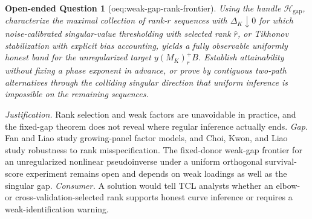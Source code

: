 \documentclass{article}
\newtheorem{openendedquestion}{Open-ended Question}
\begin{document}
\begin{openendedquestion}[oeq:weak-gap-rank-frontier]\label{oeq:weak-gap-rank-frontier}
Using the handle \(\mathcal H_{\mathrm{gap}}\), characterize the maximal collection of rank-\(r\) sequences with \(\Delta_K\downarrow0\) for which noise-calibrated singular-value thresholding with selected rank \(\widehat r\), or Tikhonov stabilization with explicit bias accounting, yields a fully observable uniformly honest band for the unregularized target \(y(M_K)_r^+B\). Establish attainability without fixing a phase exponent in advance, or prove by contiguous two-path alternatives through the colliding singular direction that uniform inference is impossible on the remaining sequences.
\end{openendedquestion}
\par\smallskip\noindent \textit{Justification.} Rank selection and weak factors are unavoidable in practice, and the fixed-gap theorem does not reveal where regular inference actually ends. \textit{Gap.} Fan and Liao study growing-panel factor models, and Choi, Kwon, and Liao study robustness to rank misspecification. The fixed-donor weak-gap frontier for an unregularized nonlinear pseudoinverse under a uniform orthogonal survival-score experiment remains open and depends on weak loadings as well as the singular gap. \textit{Consumer.} A solution would tell TCL analysts whether an elbow- or cross-validation-selected rank supports honest curve inference or requires a weak-identification warning.
\end{document}
